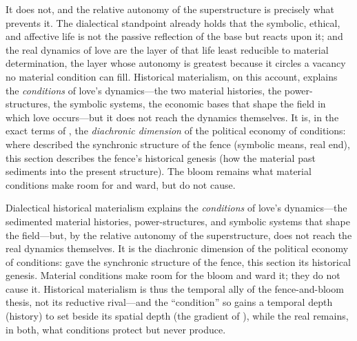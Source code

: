 It does not, and the relative autonomy of the superstructure is precisely what prevents it. The dialectical standpoint already holds that the symbolic, ethical, and affective life is not the passive reflection of the base but reacts upon it; and the real dynamics of love are the layer of that life least reducible to material determination, the layer whose autonomy is greatest because it circles a vacancy no material condition can fill. Historical materialism, on this account, explains the \emph{conditions} of love's dynamics---the two material histories, the power-structures, the symbolic systems, the economic bases that shape the field in which love occurs---but it does not reach the dynamics themselves. It is, in the exact terms of , the \emph{diachronic dimension} of the political economy of conditions: where  described the synchronic structure of the fence (symbolic means, real end), this section describes the fence's historical genesis (how the material past sediments into the present structure). The bloom remains what material conditions make room for and ward, but do not cause.

\begin{claim}
Dialectical historical materialism explains the \emph{conditions} of love's dynamics---the sedimented material histories, power-structures, and symbolic systems that shape the field---but, by the relative autonomy of the superstructure, does not reach the real dynamics themselves. It is the diachronic dimension of the political economy of conditions:  gave the synchronic structure of the fence, this section its historical genesis. Material conditions make room for the bloom and ward it; they do not cause it. Historical materialism is thus the temporal ally of the fence-and-bloom thesis, not its reductive rival---and the ``condition'' so gains a temporal depth (history) to set beside its spatial depth (the gradient of ), while the real remains, in both, what conditions protect but never produce.
\end{claim}

